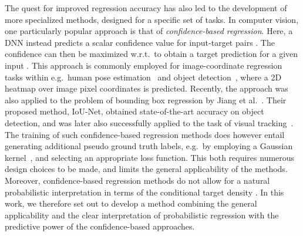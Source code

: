 \documentclass[runningheads]{llncs}
\begin{document}
The quest for improved regression accuracy has also led to the development of more specialized methods, designed for a specific set of tasks. In computer vision, one particularly popular approach is that of \emph{confidence-based regression}. Here, a DNN instead predicts a scalar confidence value for input-target pairs . The confidence can then be maximized w.r.t.\  to obtain a target prediction for a given input . This approach is commonly employed for image-coordinate regression tasks within e.g.\ human pose estimation~\cite{cao2017realtime,xiao2018simple,sun2019deep} and object detection~\cite{law2018cornernet,zhou2019bottom}, where a 2D heatmap over image pixel coordinates  is predicted. Recently, the approach was also applied to the problem of bounding box regression by Jiang et al.~\cite{jiang2018acquisition}. Their proposed method, IoU-Net, obtained state-of-the-art accuracy on object detection, and was later also successfully applied to the task of visual tracking~\cite{danelljan2019atom}. The training of such confidence-based regression methods does however entail generating additional pseudo ground truth labels, e.g.\ by employing a Gaussian kernel~\cite{convposeCVPR2016,xiao2018simple}, and selecting an appropriate loss function. This both requires numerous design choices to be made, and limits the general applicability of the methods. Moreover, confidence-based regression methods do not allow for a natural probabilistic interpretation in terms of the conditional target density . In this work, we therefore set out to develop a method combining the general applicability and the clear interpretation of probabilistic regression with the predictive power of the confidence-based approaches.
\end{document}
